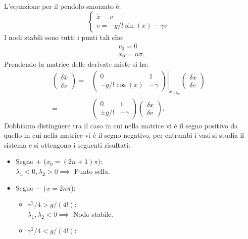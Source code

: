 \noindent
\begin{exmp}
    L'equazione per il pendolo smorzato è:
    \[
        \begin{cases}
            \dot{x} = v\\
	    \dot{v} = - g /l\sin (x) - \gamma v
        \end{cases}
    \] 
    I nodi stabili sono tutti i punti tali che:
    \[\begin{aligned}
	& v_0 = 0\\
	& x_0 = n \pi
    .\end{aligned}\]
    Prendendo la matrice delle derivate miste si ha:
    \[\begin{aligned}
	\begin{pmatrix} \delta\dot{x} \\ \delta  \dot{v} \end{pmatrix} =&
	\left.	\begin{pmatrix} 
	    0 & 1 \\
	    -g /l \cos (x) & - \gamma
	\end{pmatrix} \right|_{x_0,y_0}
	\begin{pmatrix} \delta x \\ \delta v \end{pmatrix} \\
	=&
	\begin{pmatrix} 
	    0 & 1 \\
	    \pm g /l& - \gamma
	\end{pmatrix}
	\begin{pmatrix} \delta x \\ \delta v \end{pmatrix} 
    .\end{aligned}\]
    Dobbiamo distinguere tra il caso in cui nella matrice vi è il segno positivo da quello in cui nella matrice vi è il segno negativo, per entrambi i vasi si studia il sistema e si ottengono i seguenti risultati:
    \begin{itemize}
	\item Segno $+$ ($x_0 = (2n+1)\pi$):\\
	    $\lambda_1 < 0,  \lambda_2 > 0 \implies$ Punto sella.
	\item Segno $-$ ($x = 2n\pi$): 
	    \begin{itemize}
		\item $\gamma^2 / 4 > g /(4l)$: \\
		    $\lambda_1,\lambda_2 < 0 \implies$ Nodo stabile.
		\item $\gamma^2 / 4 < g /(4l)$: \\

\end{itemize}
\end{itemize}
\end{exmp}
